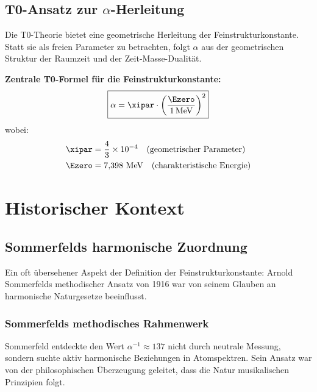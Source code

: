 	\subsection[T0-Ansatz zur alpha-Herleitung]{T0-Ansatz zur $\alpha$-Herleitung}
	
	Die T0-Theorie bietet eine geometrische Herleitung der Feinstrukturkonstante. Statt sie als freien Parameter zu betrachten, folgt $\alpha$ aus der geometrischen Struktur der Raumzeit und der Zeit-Masse-Dualität.
	
	\begin{keyresult}
		\textbf{Zentrale T0-Formel für die Feinstrukturkonstante:}
		\begin{equation}
			\boxed{\alpha = \xipar \cdot \left(\frac{\Ezero}{1\,\text{MeV}}\right)^2}
			\label{eq:alpha_main}
		\end{equation}
		wobei:
		\begin{align}
			\xipar &= \frac{4}{3} \times 10^{-4} \quad \text{(geometrischer Parameter)}\\
			\Ezero &= 7{,}398 \text{ MeV} \quad \text{(charakteristische Energie)}
		\end{align}
	\end{keyresult}
	
	\section{Historischer Kontext}
	\label{sec:historical_context}
	
	\subsection[Sommerfelds harmonische Zuordnung]{Sommerfelds harmonische Zuordnung}
	
	Ein oft übersehener Aspekt der Definition der Feinstrukturkonstante: Arnold Sommerfelds methodischer Ansatz von 1916 war von seinem Glauben an harmonische Naturgesetze beeinflusst.
	
	\subsubsection{Sommerfelds methodisches Rahmenwerk}
	
	Sommerfeld entdeckte den Wert $\alpha^{-1} \approx 137$ nicht durch neutrale Messung, sondern suchte aktiv harmonische Beziehungen in Atomspektren. Sein Ansatz war von der philosophischen Überzeugung geleitet, dass die Natur musikalischen Prinzipien folgt.
	
